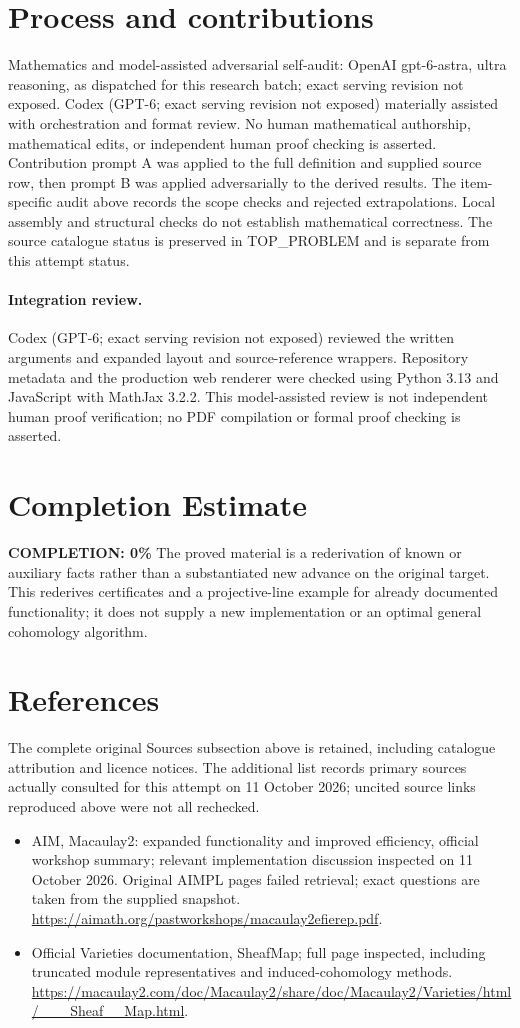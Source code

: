 \documentclass[11pt]{article}
\begin{document}
\section{Process and contributions}
Mathematics and model-assisted adversarial self-audit: OpenAI gpt-6-astra, ultra reasoning, as dispatched for this research batch; exact serving revision not exposed. Codex (GPT-6; exact serving revision not exposed) materially assisted with orchestration and format review. No human mathematical authorship, mathematical edits, or independent human proof checking is asserted.
Contribution prompt A was applied to the full definition and supplied source row, then prompt B was applied adversarially to the derived results. The item-specific audit above records the scope checks and rejected extrapolations. Local assembly and structural checks do not establish mathematical correctness. The source catalogue status is preserved in TOP\_PROBLEM and is separate from this attempt status.
\paragraph{Integration review.} Codex (GPT-6; exact serving revision not exposed) reviewed the written arguments and expanded layout and source-reference wrappers. Repository metadata and the production web renderer were checked using Python 3.13 and JavaScript with MathJax 3.2.2. This model-assisted review is not independent human proof verification; no PDF compilation or formal proof checking is asserted.

\section{Completion Estimate}
\noindent\textbf{COMPLETION: 0\%}
The proved material is a rederivation of known or auxiliary facts rather than a substantiated new advance on the original target. This rederives certificates and a projective-line example for already documented functionality; it does not supply a new implementation or an optimal general cohomology algorithm.
\section{References}
The complete original Sources subsection above is retained, including catalogue attribution and licence notices. The additional list records primary sources actually consulted for this attempt on 11 October 2026; uncited source links reproduced above were not all rechecked.
\begin{itemize}
\item AIM, Macaulay2: expanded functionality and improved efficiency, official workshop summary; relevant implementation discussion inspected on 11 October 2026. Original AIMPL pages failed retrieval; exact questions are taken from the supplied snapshot. \url{https://aimath.org/pastworkshops/macaulay2efierep.pdf}.
\item Official Varieties documentation, SheafMap; full page inspected, including truncated module representatives and induced-cohomology methods. \url{https://macaulay2.com/doc/Macaulay2/share/doc/Macaulay2/Varieties/html/___Sheaf__Map.html}.
\end{itemize}
\end{document}
